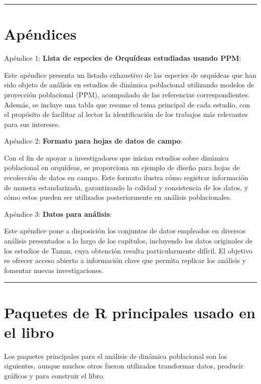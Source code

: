 \documentclass[
  12pt,
  letterpaper,
]{book}
\begin{document}
\begin{center}\rule{0.5\linewidth}{0.5pt}\end{center}

\section{Apéndices}\label{apuxe9ndices}

Apéndice 1: \textbf{Lista de especies de Orquídeas estudiadas usando
PPM}:

Este apéndice presenta un listado exhaustivo de las especies de
orquídeas que han sido objeto de análisis en estudios de dinámica
poblacional utilizando modelos de proyección poblacional (PPM),
acompañado de las referencias correspondientes. Además, se incluye una
tabla que resume el tema principal de cada estudio, con el propósito de
facilitar al lector la identificación de los trabajos más relevantes
para sus intereses.

Apéndice 2: \textbf{Formato para hojas de datos de campo}:

Con el fin de apoyar a investigadores que inician estudios sobre
dinámica poblacional en orquídeas, se proporciona un ejemplo de diseño
para hojas de recolección de datos en campo. Este formato ilustra cómo
registrar información de manera estandarizada, garantizando la calidad y
consistencia de los datos, y cómo estos pueden ser utilizados
posteriormente en análisis poblacionales.

Apéndice 3: \textbf{Datos para análisis}:

Este apéndice pone a disposición los conjuntos de datos empleados en
diversos análisis presentados a lo largo de los capítulos, incluyendo
los datos originales de los estudios de Tamm, cuya obtención resulta
particularmente difícil. El objetivo es ofrecer acceso abierto a
información clave que permita replicar los análisis y fomentar nuevas
investigaciones.

\begin{center}\rule{0.5\linewidth}{0.5pt}\end{center}

\section{Paquetes de R principales usado en el
libro}\label{paquetes-de-r-principales-usado-en-el-libro}

Los paquetes principales para el análisis de dinámica poblacional son
los siguientes, aunque muchos otros fueron utilizados transformar datos,
producir gráficos y para construir el libro.
\end{document}
